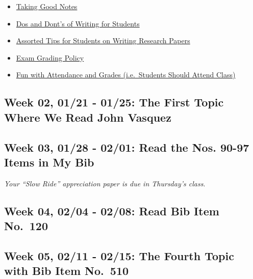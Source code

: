 \documentclass[11pt,]{article}
\providecommand{\tightlist}{%
  \setlength{\itemsep}{0pt}\setlength{\parskip}{0pt}}
\begin{document}
\begin{itemize}
\tightlist
\item
  \href{http://svmiller.com/blog/2014/09/taking-good-notes/}{Taking Good
  Notes}
\item
  \href{http://svmiller.com/blog/2015/06/dos-and-donts-of-writing-for-students/}{Dos
  and Dont's of Writing for Students}
\item
  \href{http://svmiller.com/blog/2015/12/assorted-tips-students-research-papers/}{Assorted
  Tips for Students on Writing Research Papers}
\item
  \href{https://www.dropbox.com/s/apihjs7di81aqcv/svm-exam-grading-policy.pdf?dl=0}{Exam
  Grading Policy}
\item
  \href{http://svmiller.com/blog/2016/05/fun-with-attendance-grades/}{Fun
  with Attendance and Grades (i.e.~Students Should Attend Class)}
\end{itemize}

\hypertarget{week-02-0121---0125-the-first-topic-where-we-read-john-vasquez}{%
\subsection{Week 02, 01/21 - 01/25: The First Topic Where We Read John
Vasquez}\label{week-02-0121---0125-the-first-topic-where-we-read-john-vasquez}}

\hypertarget{week-03-0128---0201-read-the-nos.-90-97-items-in-my-bib}{%
\subsection{Week 03, 01/28 - 02/01: Read the Nos. 90-97 Items in My
Bib}\label{week-03-0128---0201-read-the-nos.-90-97-items-in-my-bib}}

\emph{Your ``Slow Ride'' appreciation paper is due in Thursday's class}.

\hypertarget{week-04-0204---0208-read-bib-item-no.120}{%
\subsection{Week 04, 02/04 - 02/08: Read Bib Item
No.~120}\label{week-04-0204---0208-read-bib-item-no.120}}

\hypertarget{week-05-0211---0215-the-fourth-topic-with-bib-item-no.510}{%
\subsection{Week 05, 02/11 - 02/15: The Fourth Topic with Bib Item
No.~510}\label{week-05-0211---0215-the-fourth-topic-with-bib-item-no.510}}
\end{document}
